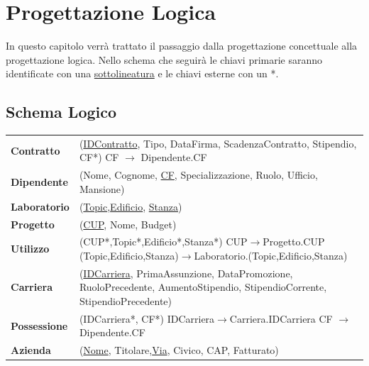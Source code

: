 \chapter{Progettazione Logica}
In questo capitolo verrà trattato il passaggio dalla progettazione concettuale alla progettazione logica. Nello schema che seguirà le chiavi primarie saranno identificate con una \underline{sottolineatura} e le chiavi esterne con un *.

\section{Schema Logico}

\begingroup
    \setlength{\tabcolsep}{20pt}
    \renewcommand{\arraystretch}{2.0}
    \begin{xltabular}{\textwidth}{l X}

        \textbf{Contratto} & (\underline{IDContratto}, Tipo, DataFirma, ScadenzaContratto, Stipendio, CF*)
        \newline CF $\rightarrow$ Dipendente.CF \\

        \textbf{Dipendente} & (Nome, Cognome, \underline{CF}, Specializzazione, Ruolo, Ufficio, Mansione) \\
       
        \textbf{Laboratorio} & (\underline{Topic},\underline{Edificio}, \underline{Stanza}) \\
       
        \textbf{Progetto} & (\underline{CUP}, Nome, Budget) 
        \\
        \textbf{Utilizzo} & (CUP*,Topic*,Edificio*,Stanza*)
        \newline CUP$\rightarrow$Progetto.CUP
        \newline (Topic,Edificio,Stanza)$\rightarrow$Laboratorio.(Topic,Edificio,Stanza) \\
        \textbf{Carriera} & (\underline{IDCarriera}, PrimaAssunzione, DataPromozione, RuoloPrecedente, AumentoStipendio, StipendioCorrente, StipendioPrecedente) \\

        \textbf{Possessione} & (IDCarriera*, CF*) 
        \newline IDCarriera$\rightarrow$Carriera.IDCarriera
        \newline CF $\rightarrow$ Dipendente.CF \\ 

        \textbf{Azienda} & (\underline{Nome}, Titolare,\underline{Via}, Civico, CAP, Fatturato) \\


\end{xltabular}
